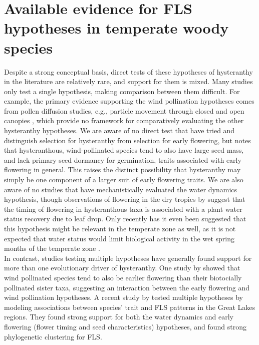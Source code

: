 \documentclass[12pt]{article}\usepackage[]{graphicx}\usepackage[]{color}
\begin{document}
\section*{Available evidence for FLS hypotheses in temperate woody species} %
\indent\indent Despite a strong conceptual basis, direct tests of these hypotheses of hysteranthy in the literature are relatively rare, and support for them is mixed. Many studies only test a single hypothesis, making comparison between them difficult. For example, the primary evidence supporting the wind pollination hypotheses comes from pollen diffusion studies, e.g., particle movement through closed and open canopies \citep{Niklas1985,Nathan2005, Milleron2012}, which provide no framework for comparatively evaluating the other hysteranthy hypotheses. We are aware of no direct test that have tried and distinguish selection for hysteranthy from selection for early flowering, but \citet{Primack1987} notes that hysteranthous, wind-pollinated species tend to also have large seed mass, and lack primary seed dormancy for germination, traits associated with early flowering in general. This raises the distinct possibility that hysteranthy may simply be one component of a larger suit of early flowering traits. We are also aware of no studies that have mechanistically evaluated the water dynamics hypothesis, though observations of flowering in the dry tropics by \citet{Borchert1983,Reich1984} suggest that the timing of flowering in hysteranthous taxa is associated with a plant water status recovery due to leaf drop. Only recently has it even been suggested that this hypothesis might be relevant in the temperate zone as well, as it is not expected that water status would limit biological activity in the wet spring months of the temperate zone \citep{Gougherty2018}.\\
\indent In contrast, studies testing multiple hypotheses have generally found support for more than one evolutionary driver of hysteranthy. One study by \citet{Bolmgren2003} showed that wind pollinated species tend to also be earlier flowering than their biotocially pollinated sister taxa, suggesting an interaction between the early flowering and wind pollination hypotheses. A recent study by \citet{Gougherty2018} tested multiple hypotheses by modeling associations between species' trait and FLS patterns in the Great Lakes regions. They found strong support for both the water dynamics and early flowering (flower timing and seed characteristics) hypotheses, and found strong phylogenetic clustering for FLS. \\
\end{document}
